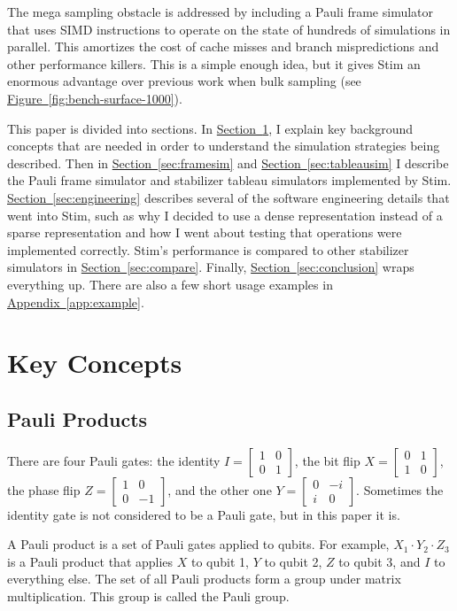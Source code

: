 \documentclass[onecolumn,unpublished]{quantumarticle}
\theoremstyle{definition}
\theoremstyle{definition}
\theoremstyle{definition}
\renewcommand{\sec}[1]{\hyperref[sec:#1]{Section~\ref*{sec:#1}}}
\DeclareRobustCommand{\app}[1]{\hyperref[app:#1]{Appendix~\ref*{app:#1}}}
\newcommand{\fig}[1]{\hyperref[fig:#1]{Figure~\ref*{fig:#1}}}
\begin{document}
The mega sampling obstacle is addressed by including a Pauli frame simulator that uses SIMD instructions to operate on the state of hundreds of simulations in parallel.
This amortizes the cost of cache misses and branch mispredictions and other performance killers.
This is a simple enough idea, but it gives Stim an enormous advantage over previous work when bulk sampling (see \fig{bench-surface-1000}).

This paper is divided into sections.
In \sec{concepts}, I explain key background concepts that are needed in order to understand the simulation strategies being described.
Then in \sec{framesim} and \sec{tableausim} I describe the Pauli frame simulator and stabilizer tableau simulators implemented by Stim.
\sec{engineering} describes several of the software engineering details that went into Stim, such as why I decided to use a dense representation instead of a sparse representation and how I went about testing that operations were implemented correctly.
Stim's performance is compared to other stabilizer simulators in \sec{compare}.
Finally, \sec{conclusion} wraps everything up.
There are also a few short usage examples in \app{example}.

\section{Key Concepts}
\label{sec:concepts}

\subsection{Pauli Products}

There are four Pauli gates: the identity $I = \begin{bmatrix} 1&0\\0&1\end{bmatrix}$, the bit flip $X = \begin{bmatrix} 0&1\\1&0\end{bmatrix}$, the phase flip $Z = \begin{bmatrix} 1&0\\0&-1\end{bmatrix}$, and the other one $Y = \begin{bmatrix} 0&-i\\i&0\end{bmatrix}$.
Sometimes the identity gate is not considered to be a Pauli gate, but in this paper it is.

A Pauli product is a set of Pauli gates applied to qubits.
For example, $X_1 \cdot Y_2 \cdot Z_3$ is a Pauli product that applies $X$ to qubit 1, $Y$ to qubit 2, $Z$ to qubit 3, and $I$ to everything else.
The set of all Pauli products form a group under matrix multiplication.
This group is called the Pauli group.
\end{document}
